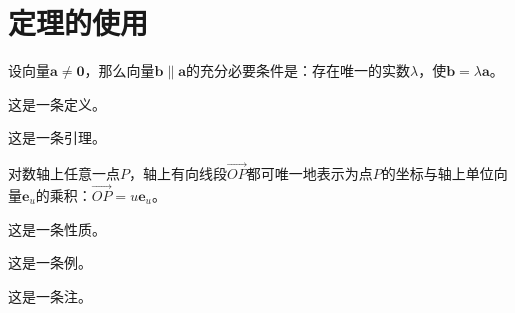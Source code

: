 \section{定理的使用}
\begin{theorem}
  设向量$\bm a\neq\bm 0$，那么向量$\bm b\parallel\bm a$的充分必要条件是：存在唯一的实数$\lambda$，使$\bm b=\lambda \bm a$。
\end{theorem}
\begin{definition}
  这是一条定义。
\end{definition}
\begin{lemma}
  这是一条引理。
\end{lemma}
\begin{corollary}
  对数轴上任意一点$P$，轴上有向线段$\overrightarrow{OP}$都可唯一地表示为点$P$的坐标与轴上单位向量$\bm e_u$的乘积：$\overrightarrow{OP}=u \bm e_u$。
\end{corollary}
\begin{proposition}
  这是一条性质。
\end{proposition}
\begin{example}
  这是一条例。
\end{example}
\begin{remark}
  这是一条注。
\end{remark}